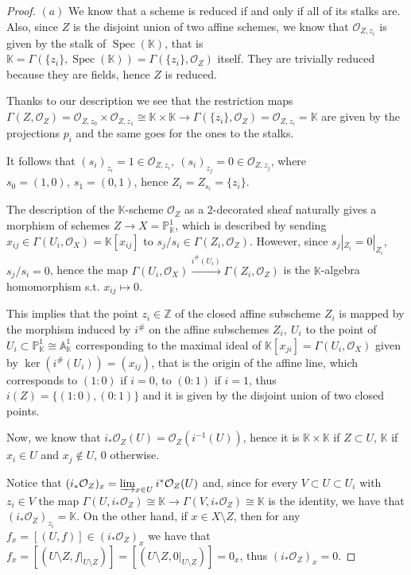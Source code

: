 \documentclass{article}
\newcommand{\numberset}{\mathbb}
\newcommand{\Z}{\numberset{Z}}
\newcommand{\K}{\numberset{K}}
\newcommand{\A}{\mathbb{A}}
\newcommand{\Ps}{\mathbb{P}}
\DeclareMathOperator{\Spec}{Spec}
\begin{document}
\begin{proof}
    $(a)$ We know that a scheme is reduced if and only if all of its stalks are.
    Also, since $Z$ is the disjoint union of two affine schemes, we know that
    $\mathcal{O}_{Z,z_i}$ is given by the stalk of $\Spec(\K)$, that is
    $\K=\Gamma(\{z_i\},\Spec(\K))=\Gamma(\{z_i\},\mathcal{O}_Z)$ itself. They
    are trivially reduced because they are fields, hence $Z$ is reduced.

    Thanks to our description we see that the restriction maps
    $\Gamma(Z,\mathcal{O}_Z)=\mathcal{O}_{Z,z_0}\times\mathcal{O}_{Z,z_1}\cong
    \K\times\K\rightarrow\Gamma(\{z_i\},\mathcal{O}_Z)=\mathcal{O}_{Z,z_i}=\K$
    are given by the projections $p_i$ and the same goes for the ones to the
    stalks.

    It follows that $(s_i)_{z_i}=1\in\mathcal{O}_{Z,z_i},\
    (s_i)_{z_j}=0\in\mathcal{O}_{Z,z_j}$, where $s_0=(1,0),\ s_1=(0,1)$, hence
    $Z_i=Z_{s_i}=\{z_i\}$.

    The description of the $\K$-scheme $\mathcal{O}_Z$ as a 2-decorated sheaf
    naturally gives a morphism of schemes $Z\rightarrow X=\Ps^1_\K$, which is
    described by sending $x_{ij}\in\Gamma(U_i,\mathcal{O}_X)=\K[x_{ij}]$ to
    $s_j/s_i\in\Gamma(Z_i,\mathcal{O}_Z)$. However, since $s_j|_{Z_i}=0|_{Z_i}$,
    $s_j/s_i=0$, hence the map $\Gamma(U_i,\mathcal{O}_X)\xrightarrow{i^\#(U_i)}
    \Gamma(Z_i,\mathcal{O}_{Z})$ is the $\K$-algebra homomorphism s.t.
    $x_{ij}\mapsto 0$.

    This implies that the point $z_i\in\Z$ of the closed affine subscheme $Z_i$
    is mapped by the morphism induced by $i^\#$ on the affine subschemes $Z_i,\
    U_i$ to the point of $U_i\subset\Ps^1_\K\cong\A^1_\K$ corresponding to the
    maximal ideal of $\K[x_{ji}]=\Gamma(U_i,\mathcal{O}_X)$ given by
    $\ker(i^\#(U_i))=(x_{ij})$, that is the origin of the affine line, which
    corresponds to $(1:0)$ if $i=0$, to $(0:1)$ if $i=1$, thus
    $i(Z)=\{(1:0),(0:1)\}$ and it is given by the disjoint union of two closed
    points.

    Now, we know that $i_*\mathcal{O}_Z(U)=\mathcal{O}_Z(i^{-1}(U))$, hence it
    is $\K\times\K$ if $Z\subset U$, $\K$ if $x_i\in U$ and $x_j\not\in U$, $0$
    otherwise.

    Notice that $(i_*\mathcal{O}_Z)_x=\varinjlim_{x\in U} i^*\mathcal{O}_Z(U)$
    and, since for every $V\subset U\subset U_i$ with $z_i\in V$ the map
    $\Gamma(U,i_*\mathcal{O}_Z)\cong\K\rightarrow\Gamma(V,i_*\mathcal{O}_Z)
    \cong\K$ is the identity, we have that $(i_*\mathcal{O}_Z)_{z_i}=\K$. On the
    other hand, if $x\in X\setminus Z$, then for any
    $f_x=[(U,f)]\in(i_*\mathcal{O}_Z)_x$ we have that $f_x=[(U\setminus
    Z,f|_{U\setminus Z})]=[(U\setminus Z,0|_{U\setminus Z})]=0_x$, thus
    $(i_*\mathcal{O}_Z)_x=0$.
    

\end{proof}
\end{document}
